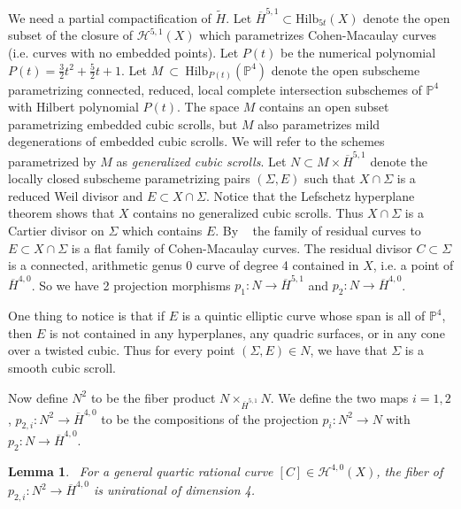 \documentclass[amssymb,twoside,12 pt,amscd,reqno]{amsart}
\theoremstyle{plain}
\newtheorem{lem}[thm]{Lemma}
\theoremstyle{definition}
\newcommand{\Hdg}[2]{\mathcal{H}^{#1,#2}}
\newcommand{\PP}{\mathbb{P}}
\def\ps{\vspace{4pt}}
\begin{document}
We need a partial compactification of $\widetilde{H}$.  Let
$\overline{H}^{5,1} \subset \text{Hilb}_{5t}(X)$ denote the open
subset of the closure of
$\Hdg{5}{1}(X)$ which parametrizes Cohen-Macaulay curves (i.e. curves with
no embedded points).  Let $P(t)$ be the numerical polynomial $P(t) = 
\frac{3}{2}t^2 + \frac{5}{2}t + 1$.  Let $M~\subset~
\text{Hilb}_{P(t)}(\PP^4)$ denote the open subscheme parametrizing
connected, reduced, local complete intersection subschemes of $\PP^4$
with Hilbert polynomial $P(t)$.  The space $M$ contains an open subset
parametrizing embedded cubic scrolls, but $M$ also parametrizes mild
degenerations of embedded cubic scrolls.  We will refer to the schemes
parametrized by $M$ as \emph{generalized cubic scrolls}.  Let
$N\subset M\times \overline{H}^{5,1}$ denote the locally
closed subscheme parametrizing pairs $(\Sigma,E)$ such that $X\cap
\Sigma$ is a reduced Weil divisor and $E\subset X\cap\Sigma$.   
Notice that the Lefschetz hyperplane
theorem shows that $X$ contains no generalized cubic scrolls.  Thus
$X\cap \Sigma$ is a Cartier divisor on $\Sigma$ which contains $E$.
By ~\cite[corollary 2.7]{HRS1} the family of
residual curves to $E\subset X\cap \Sigma$ is a flat family of
Cohen-Macaulay curves.
The residual divisor $C\subset \Sigma$ is a connected, arithmetic
genus 0 curve of degree 4 contained in $X$, i.e. a point of
$\overline{H}^{4,0}$.  So we have 2 projection morphisms
$p_1:N\rightarrow \overline{H}^{5,1}$ and
$p_2:N\rightarrow \overline{H}^{4,0}$.  

\ps

One thing to notice is that if $E$ is a quintic elliptic curve whose
span is all of $\PP^4$, then $E$ is not contained in any hyperplanes,
any quadric surfaces, or in any cone over a twisted cubic.  Thus for
every point $(\Sigma,E)\in N$, we have that $\Sigma$ is a
smooth cubic scroll.  

\ps

Now define $N^2$ to be the fiber product
$N\times_{\overline{H}^{5,1}}N$.  We define the two maps $i=1,2$, 
$p_{2,i}:N^2 \rightarrow \overline{H}^{4,0}$ to be the
compositions of the projection $p_i:N^2\rightarrow N$ with
$p_2:N\rightarrow \overline{H}^{4,0}$.  

\ps

\begin{lem}~\label{lem-urfib}  For a general quartic rational curve
$[C]\in \Hdg{4}{0}(X)$, 
the fiber of $p_{2,i}:N^2\rightarrow \overline{H}^{4,0}$ is
unirational of dimension 4.
\end{lem}
\end{document}
